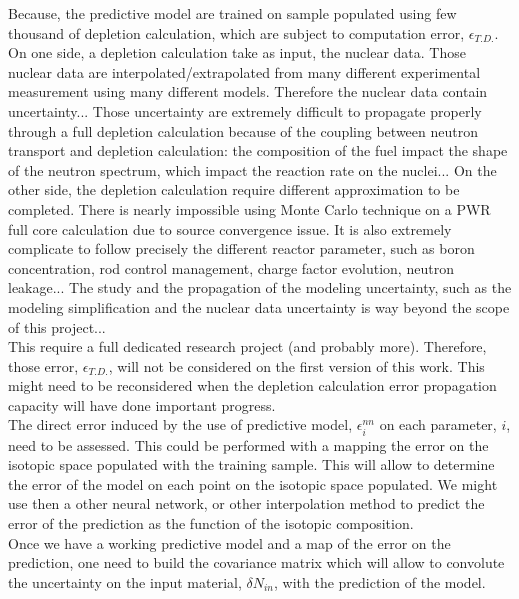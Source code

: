 \documentclass[dvips,12pt]{article}
\begin{document}
Because, the predictive model are trained on
sample populated using few thousand of depletion
calculation, which are subject to computation
error, $\epsilon_{T.D.}$. On one side, a depletion
calculation take as input, the nuclear data. Those
nuclear data are interpolated/extrapolated from
many different experimental measurement using many
different models. Therefore the nuclear data
contain uncertainty...  Those uncertainty are
extremely difficult to propagate properly through
a full depletion calculation because of the
coupling between neutron transport and depletion
calculation: the composition of the fuel impact
the shape of the neutron spectrum, which impact
the reaction rate on the nuclei... On the other
side, the depletion calculation require different
approximation to be completed. There is nearly
impossible using Monte Carlo technique on a PWR
full core calculation due to source convergence
issue. It is also extremely complicate to follow
precisely the different reactor parameter, such as
boron concentration, rod control management,
charge factor evolution, neutron leakage... The
study and the propagation of the modeling
uncertainty, such as the modeling simplification
and the nuclear data uncertainty is way beyond the
scope of this project...\\ 
This require a full dedicated research project
(and probably more). Therefore, those error,
$\epsilon_{T.D.}$, will not be considered on the
first version of this work. This might need to be
reconsidered when the depletion calculation error
propagation capacity will have done important
progress.\\
The direct error induced by the use of predictive
model, $\epsilon^{nn}_{i}$ on each parameter, $i$,
need to be assessed. This could be performed with
a mapping the error on the isotopic space
populated with the training sample. This will
allow to determine the error of the model on each
point on the isotopic space populated. We might
use then a other neural network, or other
interpolation method to predict the error of the
prediction as the function of the isotopic
composition.\\
Once we have a working predictive model and a map
of the error on the prediction, one need to build
the covariance matrix which will allow to
convolute the uncertainty on the input material,
$\delta N_{in}$, with the prediction of the
model.\\
\end{document}
